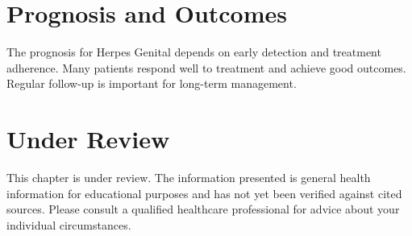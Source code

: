 \section*{Prognosis and Outcomes}
The prognosis for Herpes Genital depends on early detection and treatment adherence. Many patients respond well to treatment and achieve good outcomes. Regular follow-up is important for long-term management.
\section*{Under Review}
This chapter is under review. The information presented is general health information for educational purposes and has not yet been verified against cited sources. Please consult a qualified healthcare professional for advice about your individual circumstances.


\clearpage
